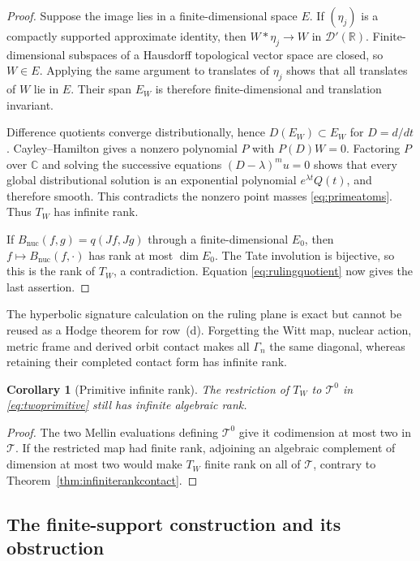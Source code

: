 \documentclass[11pt]{amsart}
\newtheorem{corollary}[theorem]{Corollary}
\theoremstyle{definition}
\theoremstyle{remark}
\begin{document}
\begin{proof}
Suppose the image lies in a finite-dimensional space $E$.  If $(\eta_j)$ is
a compactly supported approximate identity, then $W*\eta_j\to W$ in
$\mathcal D'(\mathbb R)$.  Finite-dimensional subspaces of a Hausdorff
topological vector space are closed, so $W\in E$.  Applying the same argument
to translates of $\eta_j$ shows that all translates of $W$ lie in $E$.
Their span $E_W$ is therefore finite-dimensional and translation invariant.

Difference quotients converge distributionally, hence
$D(E_W)\subset E_W$ for $D=d/dt$.  Cayley--Hamilton gives a nonzero
polynomial $P$ with $P(D)W=0$.  Factoring $P$ over $\mathbb C$ and solving
the successive equations $(D-\lambda)^m u=0$ shows that every global
distributional solution is an exponential polynomial
$e^{\lambda t}Q(t)$, and therefore smooth.  This contradicts the nonzero
point masses \eqref{eq:primeatoms}.  Thus $T_W$ has infinite rank.

If $B_{\mathrm{nuc}}(f,g)=q(Jf,Jg)$ through a finite-dimensional $E_0$,
then $f\mapsto B_{\mathrm{nuc}}(f,\cdot)$ has rank at most $\dim E_0$.
The Tate involution is bijective, so this is the rank of $T_W$, a
contradiction.  Equation \eqref{eq:rulingquotient} now gives the last assertion.
\end{proof}

The hyperbolic signature calculation on the ruling plane is exact but cannot
be reused as a Hodge theorem for row~(d).  Forgetting the Witt map, nuclear
action, metric frame and derived orbit contact makes all $\Gamma_n$ the
same diagonal, whereas retaining their completed contact form has infinite
rank.

\begin{corollary}[Primitive infinite rank]
\label{cor:primitiveinfiniterank}
The restriction of $T_W$ to $\mathcal T^0$ in
\eqref{eq:twoprimitive} still has infinite algebraic rank.
\end{corollary}

\begin{proof}
The two Mellin evaluations defining $\mathcal T^0$ give it codimension at
most two in $\mathcal T$.  If the restricted map had finite rank, adjoining
an algebraic complement of dimension at most two would make $T_W$ finite
rank on all of $\mathcal T$, contrary to
Theorem~\ref{thm:infiniterankcontact}.
\end{proof}

\subsection{The finite-support construction and its obstruction}
\end{document}
